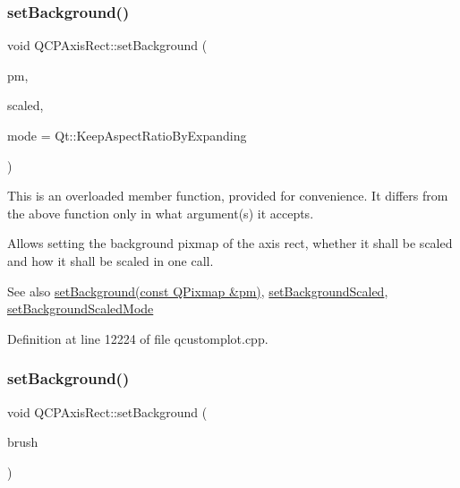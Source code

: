 \mbox{\label{class_q_c_p_axis_rect_ac48a2d5d9b7732e73b86605c69c5e4c1}} 
\subsubsection{\texorpdfstring{set\+Background()}{setBackground()}\hspace{0.1cm}{\footnotesize\ttfamily [2/3]}}
{\footnotesize\ttfamily void Q\+C\+P\+Axis\+Rect\+::set\+Background (\begin{DoxyParamCaption}\item[{const Q\+Pixmap \&}]{pm,  }\item[{bool}]{scaled,  }\item[{Qt\+::\+Aspect\+Ratio\+Mode}]{mode = {\ttfamily Qt\+:\+:KeepAspectRatioByExpanding} }\end{DoxyParamCaption})}

This is an overloaded member function, provided for convenience. It differs from the above function only in what argument(s) it accepts.

Allows setting the background pixmap of the axis rect, whether it shall be scaled and how it shall be scaled in one call.

\begin{DoxySeeAlso}{See also}
\hyperlink{class_q_c_p_axis_rect_af615ab5e52b8e0a9a0eff415b6559db5}{set\+Background(const Q\+Pixmap \&pm)}, \hyperlink{class_q_c_p_axis_rect_ae6d36c3e0e968ffb991170a018e7b503}{set\+Background\+Scaled}, \hyperlink{class_q_c_p_axis_rect_a5ef77ea829c9de7ba248e473f48f7305}{set\+Background\+Scaled\+Mode} 
\end{DoxySeeAlso}


Definition at line 12224 of file qcustomplot.\+cpp.

\mbox{\label{class_q_c_p_axis_rect_a22a22b8668735438dc06f9a55fe46b33}} 
\subsubsection{\texorpdfstring{set\+Background()}{setBackground()}\hspace{0.1cm}{\footnotesize\ttfamily [3/3]}}
{\footnotesize\ttfamily void Q\+C\+P\+Axis\+Rect\+::set\+Background (\begin{DoxyParamCaption}\item[{const Q\+Brush \&}]{brush }\end{DoxyParamCaption})}

